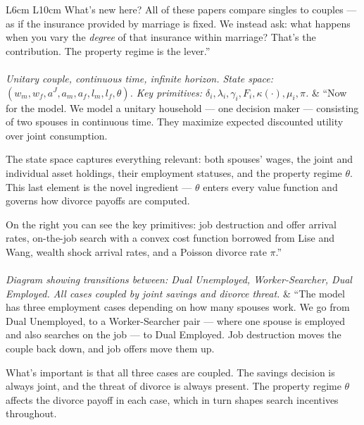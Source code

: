 \documentclass[11pt, a4paper]{article}
\begin{document}
\begin{longtable}{L{6cm} L{10cm}}
What's new here? All of these papers compare singles to couples — as if the insurance provided by marriage is fixed. We instead ask: what happens when you vary the \emph{degree} of that insurance within marriage? That's the contribution. The property regime is the lever.'' \\[1em]

\\
\textit{Unitary couple, continuous time, infinite horizon.
State space: $(w_m, w_f, a^J, a_m, a_f, l_m, l_f, \theta)$.
Key primitives: $\delta_i, \lambda_i, \gamma_i, F_i, \kappa(\cdot), \mu_i, \pi$.} &
``Now for the model. We model a unitary household — one decision maker — consisting of two spouses in continuous time. They maximize expected discounted utility over joint consumption.

The state space captures everything relevant: both spouses' wages, the joint and individual asset holdings, their employment statuses, and the property regime $\theta$. This last element is the novel ingredient — $\theta$ enters every value function and governs how divorce payoffs are computed.

On the right you can see the key primitives: job destruction and offer arrival rates, on-the-job search with a convex cost function borrowed from Lise and Wang, wealth shock arrival rates, and a Poisson divorce rate $\pi$.'' \\[1em]

\\
\textit{Diagram showing transitions between: Dual Unemployed, Worker-Searcher, Dual Employed.
All cases coupled by joint savings and divorce threat.} &
``The model has three employment cases depending on how many spouses work. We go from Dual Unemployed, to a Worker-Searcher pair — where one spouse is employed and also searches on the job — to Dual Employed. Job destruction moves the couple back down, and job offers move them up.

What's important is that all three cases are coupled. The savings decision is always joint, and the threat of divorce is always present. The property regime $\theta$ affects the divorce payoff in each case, which in turn shapes search incentives throughout.


\end{longtable}
\end{document}
